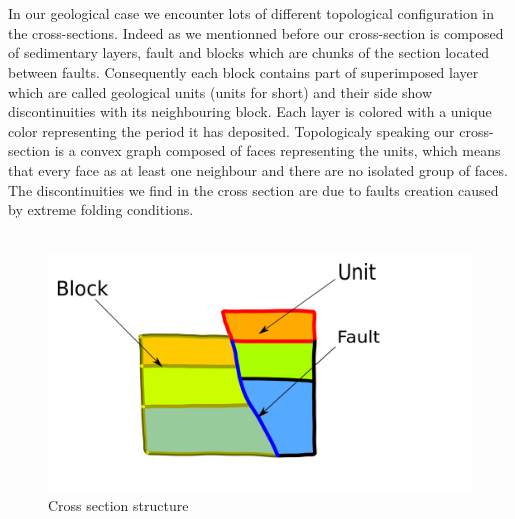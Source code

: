 \documentclass[12pt, a4paper]{memoir} %
\begin{document}
 
 \\\\
In our geological case we encounter lots of different topological configuration in the cross-sections. Indeed as we mentionned before our cross-section is composed of sedimentary layers, fault and blocks which are chunks of the section located between faults. Consequently each block contains part of superimposed layer which are called geological units (units for short) and their side show discontinuities with its neighbouring block. Each layer is colored with a unique color representing the period it has deposited. Topologicaly speaking our cross-section is a convex graph composed of faces representing the units, which means that every face as at least one neighbour and there are no isolated group of faces. The discontinuities we find in the cross section are due to faults creation caused by extreme folding conditions.\\\\
 \begin{figure}[H]
	\centering
	\includegraphics[scale=0.3]{geologyStructEdit.png}
	\caption{Cross section structure}
\end{figure}
\end{document}

